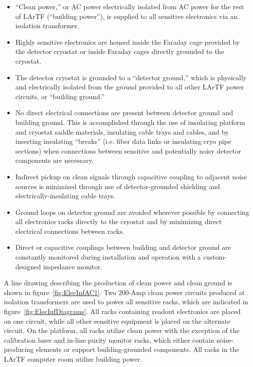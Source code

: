 \begin{itemize}
\item{``Clean power,'' or AC power electrically isolated from AC power for the rest of LArTF (``building power''), is supplied to all sensitive electronics via an isolation transformer.}
\item{Highly sensitive electronics are housed inside the Faraday cage provided by the detector cryostat or inside Faraday cages directly grounded to the cryostat.}
\item{The detector cryostat is grounded to a ``detector ground,'' which is physically and electrically isolated from the ground provided to all other LArTF power circuits, or ``building ground.''}
\item{No direct electrical connections are present between detector ground and building ground.  This is accomplished through the use of insulating platform and cryostat saddle materials, insulating cable trays and cables, and by inserting insulating ``breaks'' (i.e. fiber data links or insulating cryo pipe sections) when connections between sensitive and potentially noisy detector components are necessary.}
\item{Indirect pickup on clean signals through capacitive coupling to adjacent noise sources is minimized through use of detector-grounded shielding and electrically-insulating cable trays.}
\item{Ground loops on detector ground are avoided wherever possible by connecting all electronics racks directly to the cryostat and by minimizing direct electrical connections between racks.}
\item{Direct or capacitive couplings between building and detector ground are constantly monitored during installation and operation with a custom-designed impedance monitor.}
\end{itemize}

A line drawing describing the production of clean power and clean ground is shown in figure~\ref{fig:ElecInfAC1}.  Two 200-Amp clean power circuits produced at isolation transformers are used to power all sensitive racks, which are indicated in figure~\ref{fig:ElecInfDiagrams}.  All racks containing \lartpc readout electronics are placed on one circuit, while all other sensitive equipment is placed on the alternate circuit.  On the platform, all racks utilize clean power with the exception of the calibration laser and in-line purity monitor racks, which either contain noise-producing elements or support building-grounded components.  All racks in the LArTF computer room utilize building power.

